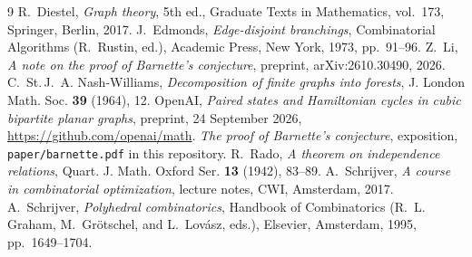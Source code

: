\documentclass[10pt]{amsart}
\numberwithin{equation}{section}
\theoremstyle{definition}
\theoremstyle{remark}
\begin{document}
\begin{thebibliography}{9}
 R.~Diestel, \emph{Graph theory}, 5th ed., Graduate Texts in Mathematics, vol.~173, Springer, Berlin, 2017.
 J.~Edmonds, \emph{Edge-disjoint branchings}, Combinatorial Algorithms (R.~Rustin, ed.), Academic Press, New York, 1973, pp.~91--96.
 Z.~Li, \emph{A note on the proof of Barnette's conjecture}, preprint, arXiv:2610.30490, 2026.
 C.~St.\,J.~A. Nash-Williams, \emph{Decomposition of finite graphs into forests}, J. London Math. Soc. \textbf{39} (1964), 12.
 OpenAI, \emph{Paired states and Hamiltonian cycles in cubic bipartite planar graphs}, preprint, 24 September 2026, \url{https://github.com/openai/math}.
 \emph{The proof of Barnette's conjecture}, exposition, \texttt{paper/barnette.pdf} in this repository.
 R.~Rado, \emph{A theorem on independence relations}, Quart. J. Math. Oxford Ser. \textbf{13} (1942), 83--89.
 A.~Schrijver, \emph{A course in combinatorial optimization}, lecture notes, CWI, Amsterdam, 2017.
 A.~Schrijver, \emph{Polyhedral combinatorics}, Handbook of Combinatorics (R.~L. Graham, M.~Gr\"otschel, and L.~Lov\'asz, eds.), Elsevier, Amsterdam, 1995, pp.~1649--1704.
\end{thebibliography}
\end{document}
